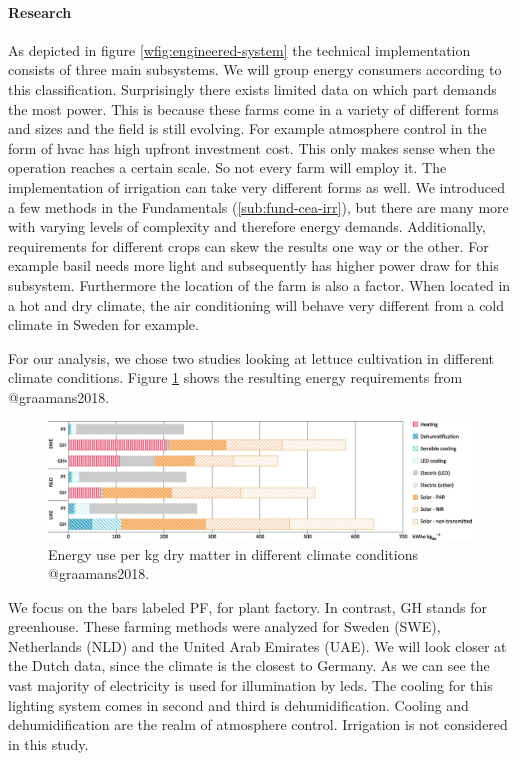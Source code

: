 \paragraph{Research}
As depicted in figure \ref{wfig:engineered-system} the technical implementation consists of three main subsystems.
We will group energy consumers according to this classification.
Surprisingly there exists limited data on which part demands the most power.
This is because these farms come in a variety of different forms and sizes and the field is still evolving.
For example atmosphere control in the form of \ac{hvac} has high upfront investment cost.
This only makes sense when the operation reaches a certain scale. %
So not every farm will employ it.
The implementation of irrigation can take very different forms as well.
We introduced a few methods in the Fundamentals (\ref{sub:fund-cea-irr}), but there are many more with varying levels of complexity and therefore energy demands.
Additionally, requirements for different crops can skew the results one way or the other.
For example basil needs more light and subsequently has higher power draw for this subsystem.
Furthermore the location of the farm is also a factor.
When located in a hot and dry climate, the air conditioning will behave very different from a cold climate in Sweden for example. 

For our analysis, we chose two studies looking at lettuce cultivation in different climate conditions.
Figure \ref{fig:energy-sensitivity} shows the resulting energy requirements from @graamans2018.
\begin{figure}[htbp]
  \centering
  \caption{Energy use per \si{\kg} dry matter in different climate conditions @graamans2018.}
  \label{fig:energy-sensitivity}
  \includegraphics[width=\textwidth]{img/energy-sensitivity.jpg}
\end{figure}
We focus on the bars labeled PF, for plant factory.
In contrast, GH stands for greenhouse.
These farming methods were analyzed for Sweden (SWE), Netherlands (NLD) and the United Arab Emirates (UAE).
We will look closer at the Dutch data, since the climate is the closest to Germany.
As we can see the vast majority of electricity is used for illumination by \acp{led}.
The cooling for this lighting system comes in second and third is dehumidification.
Cooling and dehumidification are the realm of atmosphere control.
Irrigation is not considered in this study.

